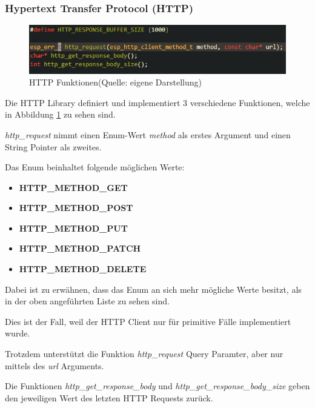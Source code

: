 \subsubsection{Hypertext Transfer Protocol (HTTP)}\label{sec:own-libraries-http}

\begin{figure}[H]
    \begin{center}
        \includegraphics[scale=1]{images/http_functions.png}
        \caption{HTTP Funktionen(Quelle: eigene Darstellung)}
        \label{abb:http_functions}
    \end{center}    
\end{figure}

Die HTTP Library definiert und implementiert 3 verschiedene Funktionen, welche in  Abbildung \ref{abb:http_functions} zu sehen sind.


\textit{http\_request} nimmt einen Enum-Wert \textit{method} als erstes Argument und einen String Pointer als zweites.

Das Enum beinhaltet folgende möglichen Werte:

\begin{itemize}
    \item \textbf{HTTP\_METHOD\_GET}
    \item \textbf{HTTP\_METHOD\_POST}
    \item \textbf{HTTP\_METHOD\_PUT}
    \item \textbf{HTTP\_METHOD\_PATCH}
    \item \textbf{HTTP\_METHOD\_DELETE}
\end{itemize}


Dabei ist zu erwähnen, dass das Enum an sich mehr mögliche Werte besitzt, als in der oben angeführten Liste zu sehen sind.

Dies ist der Fall, weil der HTTP Client nur für primitive Fälle implementiert wurde.

Trotzdem unterstützt die Funktion \textit{http\_request} Query Paramter, aber nur mittels des \textit{url} Arguments.

Die Funktionen \textit{http\_get\_response\_body} und \textit{http\_get\_response\_body\_size} geben den jeweiligen Wert des letzten HTTP Requests zurück.

